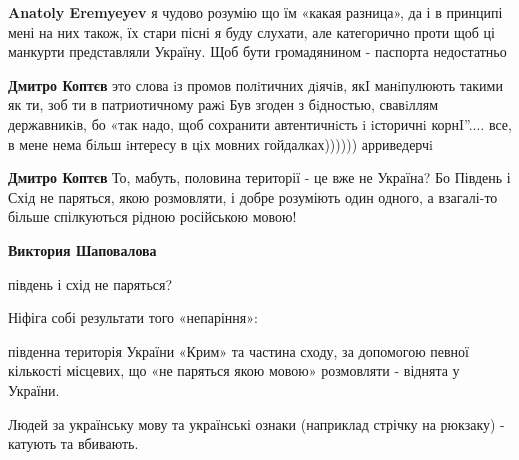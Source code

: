 \begin{itemize}
\begin{itemize}
\begin{itemize}
 
\textbf{Anatoly Eremyeyev} я чудово розумію що їм «какая разница», да і в принципі мені на них також, їх стари пісні я буду слухати, але категорично проти щоб ці манкурти представляли Україну. Щоб бути громадянином - паспорта недостатньо

 
\textbf{Дмитро Коптєв} это слова iз промов полiтичних дiячiв, якI манiпулюють такими як ти, зоб ти в патриотичному ражi Був згоден з бiдностью, свавiллям державникiв, бо «так надо, щоб сохранити автентичнiсть i iсторичнi корнI”.... все, в мене нема бiльш iнтересу в цiх мовних гойдалках)))))) арриведерчi

 
\textbf{Дмитро Коптєв} То, мабуть, половина території - це вже не Україна? Бо Південь і Схід не паряться, якою розмовляти, і добре розуміють один одного, а взагалі-то більше спілкуються рідною російською мовою!

 
\textbf{Виктория Шаповалова} 

південь і схід не паряться?

Ніфіга собі результати того «непаріння»:

південна територія України «Крим» та частина сходу, за допомогою певної
кількості місцевих, що «не паряться якою мовою» розмовляти - віднята у України.

Людей за українську мову та українські ознаки (наприклад стрічку на рюкзаку) -
катують та вбивають.


\end{itemize}
\end{itemize}
\end{itemize}
